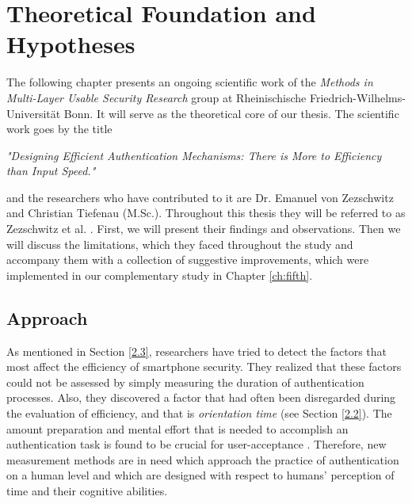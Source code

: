 
\chapter{Theoretical Foundation and Hypotheses}\label{ch:third}


The following chapter presents an ongoing scientific work of the \textit{Methods in Multi-Layer Usable Security Research} group at Rheinischische Friedrich-Wilhelms-Universit{\"a}t Bonn. It will serve as the theoretical core of our thesis. The scientific work goes by the title 
\begin{center}
 \textit{"Designing Efficient Authentication Mechanisms: There is More to Efficiency than Input Speed."}   
\end{center}

and the researchers who have contributed to it are Dr. Emanuel von Zezschwitz and Christian Tiefenau (M.Sc.). Throughout this thesis they will be referred to as Zezschwitz et al. \cite{Zezschwitz}.
First, we will present their findings and observations. Then we will discuss the limitations, which they faced throughout the study and accompany them with a collection of suggestive improvements, which were implemented in our complementary study in Chapter \ref{ch:fifth}.

\section{Approach}

As mentioned in Section \ref{2.3}, researchers have tried to detect the factors that most affect the efficiency of smartphone security. They realized that these factors could not be assessed by simply measuring the duration of authentication processes. Also, they discovered a factor that had often been disregarded during the evaluation of efficiency, and that is \textit{orientation time} (see Section \ref{2.2}). The amount preparation and mental effort that is needed to accomplish an authentication task is found to be crucial for user-acceptance \cite{Zezschwitz}. Therefore, new measurement methods are in need which approach the practice of authentication on a human level and which are designed with respect to humans' perception of time and their cognitive abilities. \\


